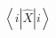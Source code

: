 \documentclass[preview]{standalone}
\begin{document}
\begin{center}
$\left<i|\hat{X}|i\right>$
\end{center}
\end{document}
